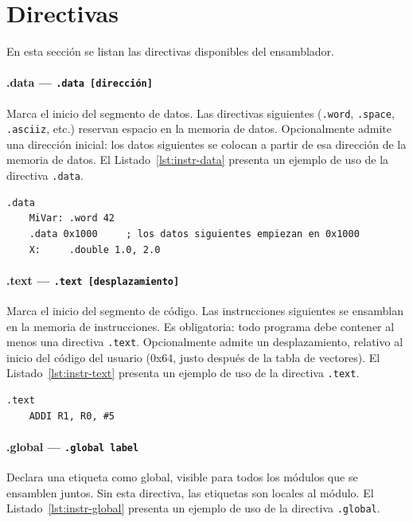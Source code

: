\documentclass[../main.tex]{subfiles}
\begin{document}
\section{Directivas}

En esta sección se listan las directivas disponibles del ensamblador.

\paragraph*{.data --- \texttt{.data [dirección]}}
Marca el inicio del segmento de datos. Las directivas siguientes (\texttt{.word}, \texttt{.space}, \texttt{.asciiz}, etc.) reservan espacio en la memoria de datos. Opcionalmente admite una dirección inicial: los datos siguientes se colocan a partir de esa dirección de la memoria de datos.
El Listado~\ref{lst:instr-data} presenta un ejemplo de uso de la directiva \texttt{.data}.

\begin{lstlisting}[caption={.data},label={lst:instr-data}]
	.data
	MiVar: .word 42
	.data 0x1000     ; los datos siguientes empiezan en 0x1000
	X:     .double 1.0, 2.0
\end{lstlisting}

\paragraph*{.text --- \texttt{.text [desplazamiento]}}
Marca el inicio del segmento de código. Las instrucciones siguientes se ensamblan en la memoria de instrucciones. Es obligatoria: todo programa debe contener al menos una directiva \texttt{.text}. Opcionalmente admite un desplazamiento, relativo al inicio del código del usuario (0x64, justo después de la tabla de vectores).
El Listado~\ref{lst:instr-text} presenta un ejemplo de uso de la directiva \texttt{.text}.

\begin{lstlisting}[caption={.text},label={lst:instr-text}]
	.text
	ADDI R1, R0, #5
\end{lstlisting}

\paragraph*{.global --- \texttt{.global label}}
Declara una etiqueta como global, visible para todos los módulos que se ensamblen juntos. Sin esta directiva, las etiquetas son locales al módulo.
El Listado~\ref{lst:instr-global} presenta un ejemplo de uso de la directiva \texttt{.global}.
\end{document}
